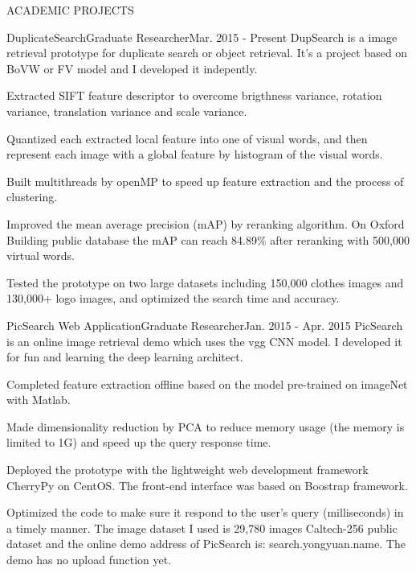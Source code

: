 \documentclass{resume} %
\begin{document}

\begin{rSection}{ACADEMIC PROJECTS}

\begin{pSubsection}{DuplicateSearch}{Graduate Researcher}{Mar. 2015 - Present}
{DupSearch is a image retrieval prototype for duplicate search or object retrieval. It's a project based on BoVW or FV model and I developed it indepently.}
\item Extracted SIFT feature descriptor to overcome brigthness variance, rotation variance, translation variance and scale variance.
\item Quantized each extracted local feature into one of visual words, and then represent each image with a global feature by histogram of the visual words.
\item Built multithreads by openMP to speed up feature extraction and the process of clustering.
\item Improved the mean average precision (mAP) by reranking algorithm. On Oxford Building public database the mAP can reach 84.89\% after reranking with 500,000 virtual words.
\item Tested the prototype on two large datasets including 150,000 clothes images and 130,000+ logo images, and optimized the search time and accuracy.
\end{pSubsection}
\vspace{-0.5em}


\begin{pSubsection}{PicSearch Web Application}{Graduate Researcher}{Jan. 2015 - Apr. 2015}
{PicSearch is an online image retrieval demo which uses the vgg CNN model. I developed it for fun and learning the deep learning architect.}
\item Completed feature extraction offline based on the model pre-trained on imageNet with Matlab.
\item Made dimensionality reduction by PCA to reduce memory usage (the memory is limited to 1G) and speed up the query response time.
\item Deployed the prototype with the lightweight web development framework CherryPy on CentOS. The front-end interface was based on Boostrap framework.
\item Optimized the code to make sure it respond to the user's query (milliseconds) in a timely manner. The image dataset I used is 29,780 images Caltech-256 public dataset and the online demo address of PicSearch is: search.yongyuan.name. The demo has no upload function yet.
\end{pSubsection}
\vspace{-0.5em}


\end{rSection}
\end{document}
